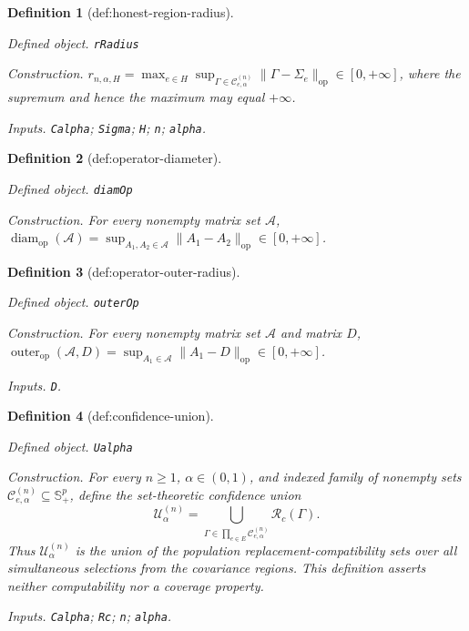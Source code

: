 \documentclass{article}
\newtheorem{definition}{Definition}
\begin{document}
\begin{definition}[def:honest-region-radius]\label{def:honest-region-radius}
\par\smallskip\noindent\emph{Defined object.} \texttt{rRadius}
\par\smallskip\noindent\emph{Construction.} \(r_{n,\alpha,H}=\max_{e\in H}\sup_{\Gamma\in\mathcal C^{(n)}_{e,\alpha}}\|\Gamma-\Sigma_e\|_{\mathrm{op}}\in[0,+\infty]\), where the supremum and hence the maximum may equal \(+\infty\).
\par\smallskip\noindent\emph{Inputs.} \texttt{Calpha}; \texttt{Sigma}; \texttt{H}; \texttt{n}; \texttt{alpha}.
\end{definition}

\begin{definition}[def:operator-diameter]\label{def:operator-diameter}
\par\smallskip\noindent\emph{Defined object.} \texttt{diamOp}
\par\smallskip\noindent\emph{Construction.} For every nonempty matrix set \(\mathcal A\), \(\operatorname{diam}_{\mathrm{op}}(\mathcal A)=\sup_{A_1,A_2\in\mathcal A}\|A_1-A_2\|_{\mathrm{op}}\in[0,+\infty]\).
\end{definition}

\begin{definition}[def:operator-outer-radius]\label{def:operator-outer-radius}
\par\smallskip\noindent\emph{Defined object.} \texttt{outerOp}
\par\smallskip\noindent\emph{Construction.} For every nonempty matrix set \(\mathcal A\) and matrix \(D\), \(\operatorname{outer}_{\mathrm{op}}(\mathcal A,D)=\sup_{A_1\in\mathcal A}\|A_1-D\|_{\mathrm{op}}\in[0,+\infty]\).
\par\smallskip\noindent\emph{Inputs.} \texttt{D}.
\end{definition}

\begin{definition}[def:confidence-union]\label{def:confidence-union}
\par\smallskip\noindent\emph{Defined object.} \texttt{Ualpha}
\par\smallskip\noindent\emph{Construction.} For every \(n\geq1\), \(\alpha\in(0,1)\), and indexed family of nonempty sets \(\mathcal C^{(n)}_{e,\alpha}\subseteq\mathbb S_{+}^{p}\), define the set-theoretic confidence union
\[
\mathcal U^{(n)}_{\alpha}
=\bigcup_{\Gamma\in\prod_{e\in E}\mathcal C^{(n)}_{e,\alpha}}
\mathcal R_c(\Gamma).
\]
Thus \(\mathcal U^{(n)}_{\alpha}\) is the union of the population replacement-compatibility sets over all simultaneous selections from the covariance regions. This definition asserts neither computability nor a coverage property.
\par\smallskip\noindent\emph{Inputs.} \texttt{Calpha}; \texttt{Rc}; \texttt{n}; \texttt{alpha}.
\end{definition}
\end{document}
